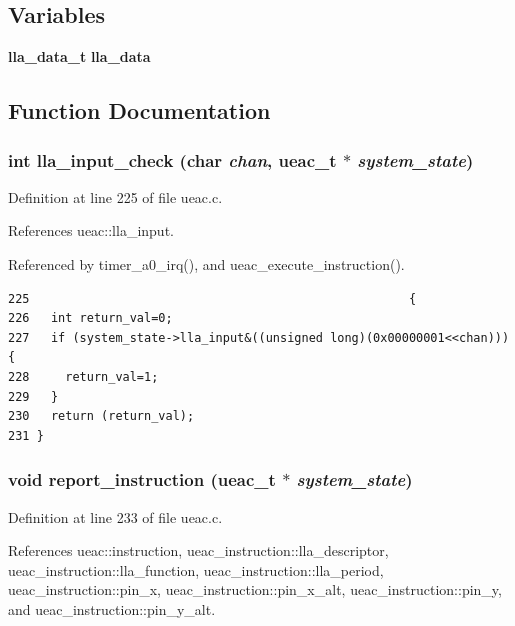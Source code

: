 \subsection*{Variables}
\begin{CompactItemize}
\item 
{\bf lla\_\-data\_\-t} {\bf lla\_\-data}
\end{CompactItemize}


\subsection{Function Documentation}
\subsubsection{\setlength{\rightskip}{0pt plus 5cm}int lla\_\-input\_\-check (char {\em chan}, {\bf ueac\_\-t} $\ast$ {\em system\_\-state})}\label{ueac_8c_a1}




Definition at line 225 of file ueac.c.

References ueac::lla\_\-input.

Referenced by timer\_\-a0\_\-irq(), and ueac\_\-execute\_\-instruction().

\footnotesize\begin{verbatim}225                                                     {
226   int return_val=0;
227   if (system_state->lla_input&((unsigned long)(0x00000001<<chan))) {
228     return_val=1;
229   }
230   return (return_val);
231 }
\end{verbatim}\normalsize 


\subsubsection{\setlength{\rightskip}{0pt plus 5cm}void report\_\-instruction ({\bf ueac\_\-t} $\ast$ {\em system\_\-state})}\label{ueac_8c_a2}




Definition at line 233 of file ueac.c.

References ueac::instruction, ueac\_\-instruction::lla\_\-descriptor, ueac\_\-instruction::lla\_\-function, ueac\_\-instruction::lla\_\-period, ueac\_\-instruction::pin\_\-x, ueac\_\-instruction::pin\_\-x\_\-alt, ueac\_\-instruction::pin\_\-y, and ueac\_\-instruction::pin\_\-y\_\-alt.

